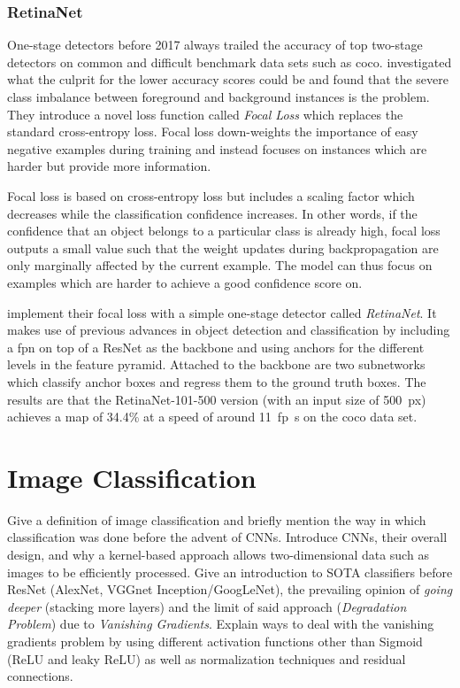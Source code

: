 \documentclass[draft,final]{vutinfth} %
\begin{document}
\subsubsection{RetinaNet}
\label{sssec:theory-retinanet}

One-stage detectors before 2017 always trailed the accuracy of top
two-stage detectors on common and difficult benchmark data sets such
as \gls{coco}. \textcite{lin2017b} investigated what the culprit for
the lower accuracy scores could be and found that the severe class
imbalance between foreground and background instances is the
problem. They introduce a novel loss function called \emph{Focal Loss}
which replaces the standard cross-entropy loss. Focal loss
down-weights the importance of easy negative examples during training
and instead focuses on instances which are harder but provide more
information.

Focal loss is based on cross-entropy loss but includes a scaling
factor which decreases while the classification confidence
increases. In other words, if the confidence that an object belongs to
a particular class is already high, focal loss outputs a small value
such that the weight updates during backpropagation are only
marginally affected by the current example. The model can thus focus
on examples which are harder to achieve a good confidence score on.

\textcite{lin2017b} implement their focal loss with a simple one-stage
detector called \emph{RetinaNet}. It makes use of previous advances in
object detection and classification by including a \gls{fpn} on top of
a ResNet \cite{he2016} as the backbone and using anchors for the
different levels in the feature pyramid. Attached to the backbone are
two subnetworks which classify anchor boxes and regress them to the
ground truth boxes. The results are that the RetinaNet-101-500 version
(with an input size of \qty{500}{px}) achieves a \gls{map} of 34.4\%
at a speed of around \qty{11}{fp\s} on the \gls{coco} data set.

\section{Image Classification}
\label{sec:background-classification}

Give a definition of image classification and briefly mention the way
in which classification was done before the advent of CNNs. Introduce
CNNs, their overall design, and why a kernel-based approach allows
two-dimensional data such as images to be efficiently processed. Give
an introduction to SOTA classifiers before ResNet (AlexNet, VGGnet
Inception/GoogLeNet), the prevailing opinion of \emph{going deeper}
(stacking more layers) and the limit of said approach
(\emph{Degradation Problem}) due to \emph{Vanishing
Gradients}. Explain ways to deal with the vanishing gradients problem
by using different activation functions other than Sigmoid (ReLU and
leaky ReLU) as well as normalization techniques and residual
connections. 
\end{document}
